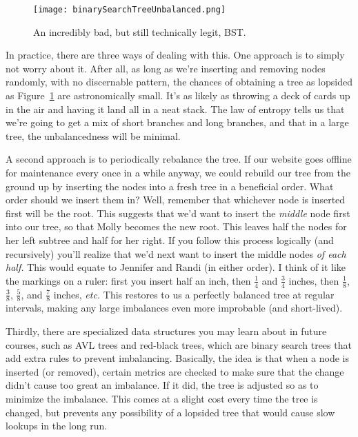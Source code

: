 \begin{figure}[ht]
\centering
\texttt{[image: binarySearchTreeUnbalanced.png]}
\caption{An incredibly bad, but still technically legit, BST.}
\label{bstunbalanced}
\end{figure}

In practice, there are three ways of dealing with this. One approach is to
simply not worry about it. After all, as long as we're inserting and
removing nodes randomly, with no discernable pattern, the chances of
obtaining a tree as lopsided as Figure~\ref{bstunbalanced} are
astronomically small. It's as likely as throwing a deck of cards up in the
air and having it land all in a neat stack. The law of entropy tells us
that we're going to get a mix of short branches and long branches, and that
in a large tree, the unbalancedness will be minimal.

A second approach is to periodically rebalance the tree. If our website
goes offline for maintenance every once in a while anyway, we could rebuild
our tree from the ground up by inserting the nodes into a fresh tree in a
beneficial order. What order should we insert them in? Well, remember that
whichever node is inserted first will be the root. This suggests that we'd
want to insert the \textit{middle} node first into our tree, so that Molly
becomes the new root. This leaves half the nodes for her left subtree and
half for her right. If you follow this process logically (and recursively)
you'll realize that we'd next want to insert the middle nodes \textit{of
each half.} This would equate to Jennifer and Randi (in either order). I
think of it like the markings on a ruler: first you insert half an inch,
then $\frac{1}{4}$ and $\frac{3}{4}$ inches, then $\frac{1}{8}$,
$\frac{3}{8}$, $\frac{5}{8}$, and $\frac{7}{8}$ inches, \textit{etc.} This
restores to us a perfectly balanced tree at regular intervals, making any
large imbalances even more improbable (and short-lived).

Thirdly, there are specialized data structures you may learn about in
future courses, such as AVL trees and red-black trees, which are binary
search trees that add extra rules to prevent imbalancing. Basically, the
idea is that when a node is inserted (or removed), certain metrics are
checked to make sure that the change didn't cause too great an imbalance.
If it did, the tree is adjusted so as to minimize the imbalance. This comes
at a slight cost every time the tree is changed, but prevents any
possibility of a lopsided tree that would cause slow lookups in the long
run.

